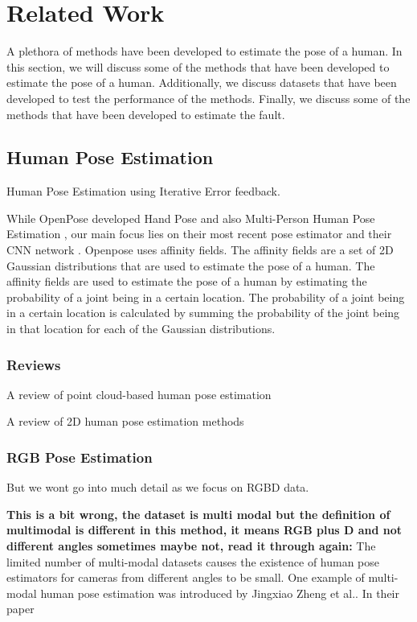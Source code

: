 \section{Related Work}
\label{sec:related_work}

A plethora of methods have been developed to estimate the pose of a human. In this section, we will discuss some of the methods that have been developed to estimate the pose of a human. Additionally, we discuss datasets that have been developed to test the performance of the methods. Finally, we discuss some of the methods that have been developed to estimate the fault.

\subsection{Human Pose Estimation}


Human Pose Estimation using Iterative Error feedback. \cite{IterativeErrorFeedback}

While OpenPose developed Hand Pose\cite{OpenPoseHand} and also Multi-Person Human Pose Estimation \cite{OpenPoseMulti}, our main focus lies on their most recent pose estimator \cite{OpenPosePose} and their CNN network \cite{OpenPoseCNN}. Openpose uses affinity fields. The affinity fields are a set of 2D Gaussian distributions that are used to estimate the pose of a human. The affinity fields are used to estimate the pose of a human by estimating the probability of a joint being in a certain location. The probability of a joint being in a certain location is calculated by summing the probability of the joint being in that location for each of the Gaussian distributions.

\subsubsection{Reviews}


A review of point cloud-based human pose estimation \cite{ReviewPointcloudHPE}

A review of 2D human pose estimation methods \cite{ReviewHPE}

\subsubsection{RGB Pose Estimation}

But we wont go into much detail as we focus on RGBD data.

\textbf{This is a bit wrong, the dataset is multi modal but the definition of multimodal is different in this method, it means RGB plus D and not different angles sometimes maybe not, read it through again:}
The limited number of multi-modal datasets causes the existence of human pose estimators for cameras from different angles to be small. One example of multi-modal human pose estimation was introduced by Jingxiao Zheng et al.\cite{MultiModalHPERGBD}. In their paper 

